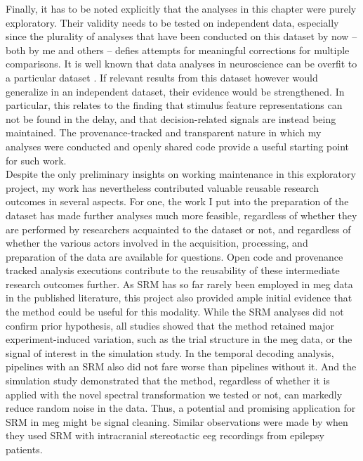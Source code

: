 Finally, it has to be noted explicitly that the analyses in this chapter were purely exploratory.
Their validity needs to be tested on independent data, especially since the plurality of analyses that have been conducted on this dataset by now -- both by me and others -- defies attempts for meaningful corrections for multiple comparisons.
It is well known that data analyses in neuroscience can be overfit to a particular dataset \citep{hosseini2020tried}.
If relevant results from this dataset however would generalize in an independent dataset, their evidence would be strengthened.
In particular, this relates to the finding that stimulus feature representations can not be found in the delay, and that  decision-related signals are instead being maintained.
The provenance-tracked and transparent nature in which my analyses were conducted and openly shared code provide a useful starting point for such work.\\
Despite the only preliminary insights on working maintenance in this exploratory project, my work has nevertheless contributed valuable reusable research outcomes in several aspects.
For one, the work I put into the preparation of the dataset has made further analyses much more feasible, regardless of whether they are performed by researchers acquainted to the dataset or not, and regardless of whether the various actors involved in the acquisition, processing, and preparation of the data are available for questions.
Open code and provenance tracked analysis executions contribute to the reusability of these intermediate research outcomes further.
As \gls{SRM} has so far rarely been employed in \gls{meg} data in the published literature, this project also provided ample initial evidence that the method could be useful for this modality.
While the \gls{SRM} analyses did not confirm prior hypothesis, all studies showed that the method retained major experiment-induced variation, such as the trial structure in the \gls{meg} data, or the signal of interest in the simulation study.
In the temporal decoding analysis, pipelines with an \gls{SRM} also did not fare worse than pipelines without it.
And the simulation study demonstrated that the method, regardless of whether it is applied with the novel spectral transformation we tested or not, can markedly reduce random noise in the data.
Thus, a potential and promising application for \gls{SRM} in \gls{meg} might be signal cleaning.
Similar observations were made by \citet{xie2021minimal} when they used \gls{SRM} with intracranial stereotactic \gls{eeg} recordings from epilepsy patients.\\
